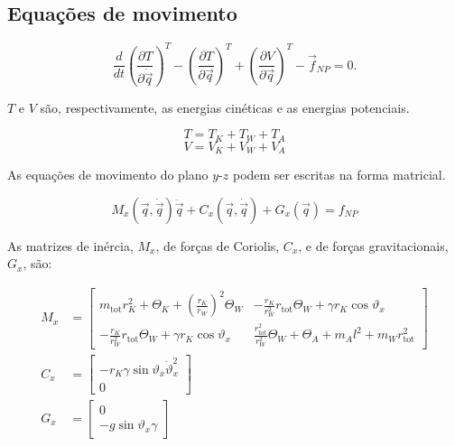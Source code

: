 \subsection{Equações de movimento}

\begin{equation*}
    \frac{d}{dt} \left( \frac{\partial T}{\partial \dot{\vec{q}}} \right)^T - \left( \frac{\partial T}{\partial \vec{q}} \right)^T + \left( \frac{\partial V}{\partial \vec{q}} \right)^T - \vec{f}_{NP} = 0.
\end{equation*}

$T$ e $V$ são, respectivamente, as energias cinéticas e as energias potenciais.

\begin{equation*}
    T = T_K + T_W + T_A
\end{equation*}
\begin{equation*}
    V = V_K + V_W + V_A
\end{equation*}

As equações de movimento do plano $y$-$z$ podem ser escritas na forma matricial.

\begin{equation*}
M_x(\vec{q}, \dot{\vec{q}}) \ddot{\vec{q}} + C_x(\vec{q}, \dot{\vec{q}}) + G_x(\vec{q}) = f_{NP}
\end{equation*}

As matrizes de inércia, $M_x$, de forças de Coriolis, $C_x$, e de forças gravitacionais, $G_x$, são:

\begin{equation*}
    \begin{aligned}
    M_x &= 
    \begin{bmatrix}
    m_{\text{tot}} r_K^2 + \Theta_K + \left( \frac{r_K}{r_W} \right)^2 \Theta_W & -\frac{r_K}{r_W^2} r_{\text{tot}} \Theta_W + \gamma r_K \cos \vartheta_x \\
    -\frac{r_K}{r_W^2} r_{\text{tot}} \Theta_W + \gamma r_K \cos \vartheta_x & \frac{r_{\text{tot}}^2}{r_W^2} \Theta_W + \Theta_A + m_A l^2 + m_W r_{\text{tot}}^2
    \end{bmatrix}
    \\
    C_x &= 
    \begin{bmatrix}
    -r_K \gamma \sin \vartheta_x \dot{\vartheta}_x^2 \\
    0
    \end{bmatrix}
    \\
    G_x &= 
    \begin{bmatrix}
    0 \\
    -g \sin \vartheta_x \gamma
    \end{bmatrix}
    \end{aligned}
\end{equation*}

